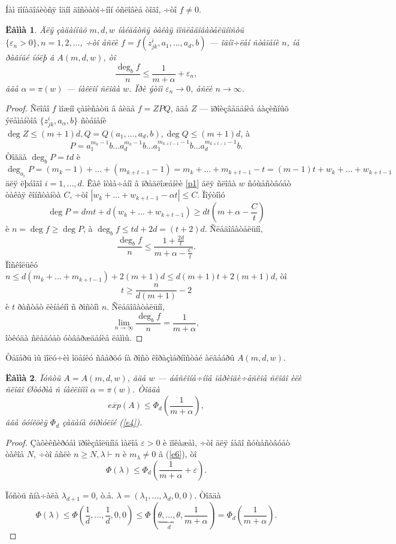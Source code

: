 \documentclass{article}
\numberwithin{equation}{section}
\theoremstyle{plain}
\newtheorem{lemma}{Ëåììà}[section]
\theoremstyle{definition}
\newtheorem{proof}{Äîêàçàòåëüñòâî}
\begin{document}
\begin{fulltext}
Íàì ïîíàäîáèòñÿ îäíî äîñòàòî÷íîí óñëîâèå òîãî, ÷òî $f\ne 0$.

\begin{lemma}\label{A0}
Äëÿ çàäàííûõ $m,d,w$ íàéäåòñÿ òàêàÿ ïîñëåäîâàòåëüíîñòü $\{\varepsilon_n>0\}, n=1,2,\ldots$, 
÷òî åñëè $f=f(z^i_{jk},a_1,\ldots,a_d,b)$ --- îäíî÷ëåí ñòåïåíè $n$, íå ðàâíûé íóëþ â
$A(m,d,w)$, òî
$$
\frac{\deg_b f}{n} \le\frac{1}{m+\alpha}+\varepsilon_n,
$$
ãäå $\alpha=\pi(w)$ --- íàêëîí ñëîâà $w$. Ïðè ýòîì $\varepsilon_n\to 0$, åñëè $n\to\infty$.
\end{lemma}
\begin{proof}
Ñëîâî $f$ ìîæíî çàïèñàòü â âèäå $f=ZPQ$, ãäå $Z$ --- ïðîèçâåäåíèå áàçèñíûõ ýëåìåíòîâ 
$\{z^i_{jk},a_\alpha, b\}$ ñòåïåíè $\deg Z\le (m+1)d, Q=Q(a_1,\ldots,a_d,b), \deg Q \le 
(m+1)d$, à 
$$
P=a_1^{m_k-1}b\ldots a_d^{m_k-1}b\ldots a_1^{m_{k+t-1}-1}b\ldots a_d^{m_{k+t-1}-1}b.
$$
Òîãäà $\deg_b P=td$ è
$$
\deg_{a_i}P=(m_k-1)+\ldots+(m_{k+t-1}-1)=m_k+\ldots+m_{k+t-1}-t=
(m-1)t+w_k+\ldots+w_{k+t-1}
$$
äëÿ ëþáîãî $i=1,\ldots,d$. Êàê îòìå÷åíî â ïðåäëîæåíèè \ref{p1} äëÿ ñëîâà $w$ ñóùåñòâóåò òàêàÿ
 êîíñòàíòà $C$, ÷òî $|w_k+\ldots+w_{k+t-1}-\alpha t| \le C$. Ïîýòîìó
$$
\deg P=dmt+d(w_k+\ldots+w_{k+t-1})\ge dt(m+\alpha-\frac{C}{t})
$$
è $n=\deg f\ge \deg P$, à $\deg_b f \le td+2d=(t+2)d$. Ñëåäîâàòåëüíî,
$$
\frac{\deg_b f}{n} \le \frac{1+\frac{2d}{t}}{m+\alpha-\frac{C}{t}}.
$$
Ïîñêîëüêó $n\le d(m_k+\ldots+m_{k+t-1})+2(m+1)d \le d(m+1)t+2(m+1)d$, òî
$$
t\ge \frac{n}{d(m+1)} - 2
$$
è $t$ ðàñòåò ëèíåéíî ñ ðîñòîì $n$. Ñëåäîâàòåëüíî,
$$
\lim_{n\to\infty} \frac{\deg_b f}{n} = \frac{1}{m+\alpha},
$$
îòêóäà ñëåäóåò óòâåðæäåíèå ëåììû.

\end{proof}

Òåïåðü ìû ïîëó÷èì îöåíêó ñâåðõó íà ðîñò êîðàçìåðíîñòåé àëãåáðû $A(m,d,w)$.

\begin{lemma}\label{A1}
Ïóñòü $A=A(m,d,w)$, ãäå $w$ --- áåñêîíå÷íîå ïåðèîäè÷åñêîå ñëîâî èëè  ñëîâî Øòóðìà ñ
íàêëîíîì $\alpha=\pi(w)$. Òîãäà
$$
\overline{exp}(A)\le\Phi_d(\frac{1}{m+\alpha}),
$$
ãäå ôóíêöèÿ $\Phi_d$ çàäàíà ôîðìóëîé (\ref{e4}).
\end{lemma}
\begin{proof}
Çàôèêñèðóåì ïðîèçâîëüíîå ìàëîå $\varepsilon>0$ è ïîêàæåì, ÷òî äëÿ íåãî ñóùåñòâóåò òàêîå
$N$, ÷òî åñëè $n\ge N, \lambda\vdash n$ è $m_\lambda\ne 0$ â (\ref{e6}), òî
$$
\Phi(\lambda) \le \Phi_d\left(\frac{1}{m+\alpha}+\varepsilon\right).
$$

Ïóñòü ñíà÷àëà $\lambda_{d+1}=0$, ò.å. $\lambda=(\lambda_1,\ldots,\lambda_d,0,0)$. Òîãäà
$$
\Phi(\lambda) \le\Phi\left(\frac{1}{d},\ldots,\frac{1}{d},0,0\right) \le 
\Phi\left(\underbrace{\theta,\ldots,\theta}_d,\frac{1}{m+\alpha}\right) =
\Phi_d\left(\frac{1}{m+\alpha} \right).
$$


\end{proof}
\end{fulltext}
\end{document}
